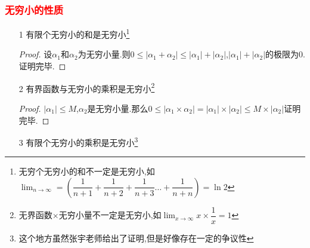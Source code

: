 \documentclass[8pt a4paper, oneside, UTF8]{ctexbook}
\begin{document}
\begin{sloppypar}
    \subsubsection{\textcolor{red}{无穷小的性质}}
    \begin{itemize}
        \item[1] 有限个无穷小的和是无穷小\footnote{无穷个无穷小的和不一定是无穷小,如$\lim_{n \to \infty}=(\dfrac{1}{n+1}+\dfrac{1}{n+2}+\dfrac{1}{n+3}\dots +\dfrac{1}{n+n})=\ln 2$}
            \begin{proof}
                设$\alpha_1$和$\alpha_2$为无穷小量.则$0 \leqslant |\alpha_1+\alpha_2|\leqslant |\alpha_1|+|\alpha_2|$,$|\alpha_1|+|\alpha_2|$的极限为0.证明完毕.
            \end{proof}
        \item[2] 有界函数与无穷小的乘积是无穷小\footnote{无界函数$\times$无穷小量不一定是无穷小,如$\lim_{x \to \infty}x \times \dfrac{1}{x}=1$}
            \begin{proof}
                $|\alpha _1|\leqslant M$,$\alpha_2$是无穷小量.那么$0\leqslant|\alpha_1 \times \alpha_2|=|\alpha_1|\times |\alpha_2|\leqslant M \times |\alpha_2|$证明完毕.
            \end{proof}
        \item[3] 有限个无穷小的乘积是无穷小\footnote{这个地方虽然张宇老师给出了证明,但是好像存在一定的争议性}
    \end{itemize}

\end{sloppypar}
\end{document}
